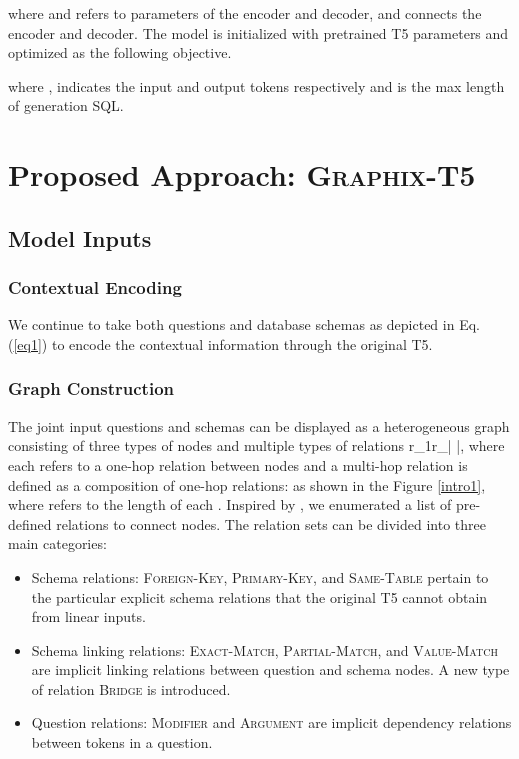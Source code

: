\documentclass[letterpaper]{article} \usepackage{aaai23}  \usepackage{times}  \usepackage{helvet}  \usepackage{courier}  \usepackage[hyphens]{url}  \usepackage{graphicx} \usepackage{amsmath}
\newcommand{\graphix}{\textsc{Graphix}\xspace}
\begin{document}
where  and  refers to parameters of the encoder and decoder, and
 connects the encoder and decoder. 
The model is initialized with pretrained T5 parameters and optimized as the following objective.

where ,  indicates the input and output tokens respectively and  is the max length of generation SQL.

\section{Proposed Approach: \graphix-T5}
\subsection{Model Inputs}
\subsubsection{Contextual Encoding}
We continue to take both questions and database schemas as depicted in Eq. (\ref{eq1}) to encode the contextual information through the original T5. 

\subsubsection{Graph Construction}
The joint input questions and schemas can be displayed as a heterogeneous graph  consisting of three types of nodes  and multiple types of relations r_1r_{\left|  \right|}, where each  refers to a one-hop relation between nodes and a multi-hop relation  is defined as a composition of one-hop relations:  as shown in the Figure \ref{intro1}, where  refers to the length of each . 
Inspired by \citep{wang-etal-2020-rat, lgesql, sdcup,s2sql}, we enumerated a list of pre-defined relations to connect nodes. The relation sets can be divided into three main categories:
\begin{itemize}
    \item Schema relations: \textsc{Foreign-Key}, \textsc{Primary-Key}, and \textsc{Same-Table} pertain to the particular explicit schema relations that the original T5 cannot obtain from linear inputs.
    \item Schema linking relations: \textsc{Exact-Match}, \textsc{Partial-Match}, and \textsc{Value-Match} are implicit linking relations between question and schema nodes. A new type of relation \textsc{Bridge} is introduced.
    \item Question relations: \textsc{Modifier} and \textsc{Argument} are implicit dependency relations between tokens in a question. 
\end{itemize}
\end{document}

